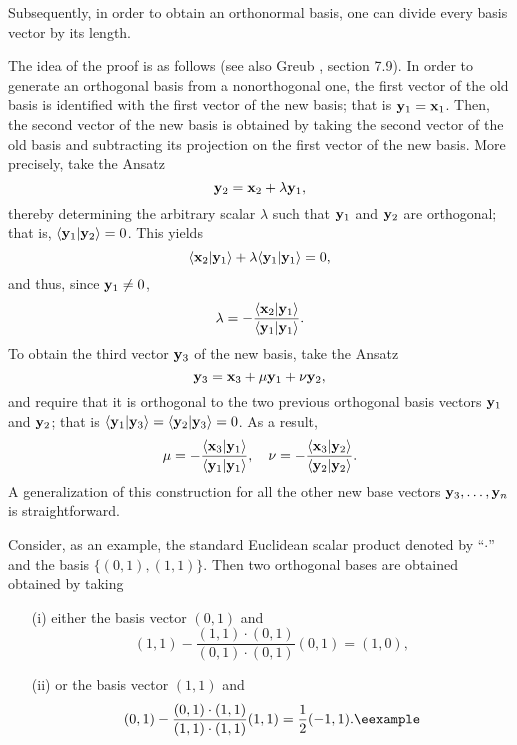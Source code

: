 Subsequently, in order to obtain an orthonormal basis,
one can divide every basis vector by its length.

{\color{OliveGreen}
\bproof
The idea of the proof is as follows (see also Greub \cite{Greub75}, section 7.9).
In order to generate an orthogonal basis from a nonorthogonal one,
the first vector of the old basis is identified with the first vector of the new basis;
that is ${\bf y}_1={\bf x}_1$.
Then, the second vector of the new basis is obtained by
taking the second vector of the old basis and
subtracting its projection on the first vector of the new basis.
More precisely, take the Ansatz
\begin{equation}
{\bf y}_2={\bf x}_2 + \lambda  {\bf y}_1,
\end{equation}
thereby determining the arbitrary scalar $\lambda$ such that
${\bf y}_1$
and
${\bf y}_2$
are orthogonal; that is,
$\langle {\bf y}_1\vert {\bf y}_2 \rangle =0$.
This yields
\begin{equation}
\langle {\bf x}_2\vert {\bf y}_1  \rangle
+ \lambda
\langle {\bf y}_1\vert {\bf y}_1 \rangle =0,
\end{equation}
and thus, since ${\bf y}_1 \neq 0$,
\begin{equation}
\lambda =
-
\frac{\langle {\bf x}_2\vert {\bf y}_1  \rangle}
{\langle {\bf y}_1\vert {\bf y}_1 \rangle} .
\end{equation}
To obtain the third vector ${\bf y}_3$ of the new basis,
take the Ansatz
\begin{equation}
{\bf y}_3={\bf x}_3 + \mu  {\bf y}_1  + \nu  {\bf y}_2,
\end{equation}
and require that it is orthogonal to the two previous orthogonal basis vectors
${\bf y}_1$
and
${\bf y}_2$;
that is
$\langle {\bf y}_1\vert {\bf y}_3 \rangle =\langle {\bf y}_2\vert {\bf y}_3 \rangle =0$.
As a result,
\begin{equation}
\mu = -  \frac{\langle {\bf x}_3\vert {\bf y}_1  \rangle}
{\langle {\bf y}_1\vert {\bf y}_1 \rangle},\quad
\nu =- \frac{\langle {\bf x}_3\vert {\bf y}_2  \rangle}
{\langle {\bf y}_2\vert {\bf y}_2 \rangle}.
\end{equation}
A generalization of this construction for all the other new base vectors
${\bf y}_3, \ldots ,  {\bf y}_n$ is straightforward.
\eproof
}

{\color{blue}
\bexample
Consider, as an example, the standard Euclidean scalar product denoted by ``$\cdot$''
and the basis
$\{(0,1),(1,1)\}$.
Then two orthogonal bases are obtained obtained by taking
\begin{itemize}
\item[(i)]
either the basis vector
$(0,1)$ and
$$
(1,1) -
\frac{(1,1)\cdot (0,1)}{(0,1)\cdot (0,1)} (0,1) = (1,0),
$$
\item[(ii)]
or the basis vector
$(1,1)$ and
$$
(0,1) -
\frac{(0,1)\cdot (1,1)}{(1,1)\cdot (1,1)} (1,1) = \frac{1}{2}(-1,1). \textrm{\eexample}
$$
\end{itemize}
}

